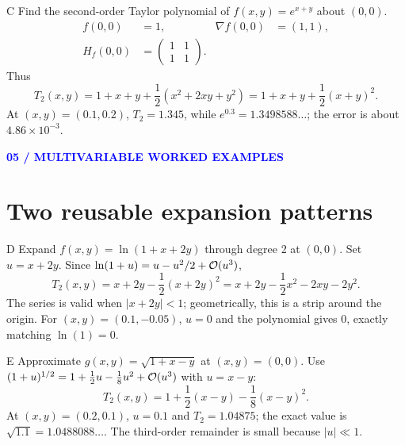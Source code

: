 \documentclass[11pt]{article}
\newcommand{\sectiontag}[1]{\textcolor{blue}{\sffamily\footnotesize\bfseries #1}\par\vspace{2pt}}
\begin{document}
\begin{worked}{C}
Find the second-order Taylor polynomial of $\displaystyle f(x,y)=e^{x+y}$ about $(0,0)$.
\begin{align*}
f(0,0)&=1, & \nabla f(0,0)&=(1,1),\\
H_f(0,0)&=\begin{pmatrix}1&1\\1&1\end{pmatrix}.
\end{align*}
Thus
\[
T_2(x,y)=1+x+y+\frac12(x^2+2xy+y^2)=1+x+y+\frac12(x+y)^2.
\]
At $(x,y)=(0.1,0.2)$, $T_2=1.345$, while $e^{0.3}=1.3498588\ldots$; the error is about $4.86\times10^{-3}$.
\end{worked}

\sectiontag{05 / MULTIVARIABLE WORKED EXAMPLES}\section*{Two reusable expansion patterns}
\begin{worked}{D}
Expand $\displaystyle f(x,y)=\ln(1+x+2y)$ through degree 2 at $(0,0)$.
Set $u=x+2y$. Since $\ln(1+u)=u-u^2/2+\mathcal O(u^3)$,
\[
T_2(x,y)=x+2y-\frac12(x+2y)^2
=x+2y-\frac12x^2-2xy-2y^2.
\]
The series is valid when $|x+2y|<1$; geometrically, this is a strip around the origin. For $(x,y)=(0.1,-0.05)$, $u=0$ and the polynomial gives $0$, exactly matching $\ln(1)=0$.
\end{worked}
\begin{worked}{E}
Approximate $\displaystyle g(x,y)=\sqrt{1+x-y}$ at $(x,y)=(0,0)$.
Use $(1+u)^{1/2}=1+\frac12u-\frac18u^2+\mathcal O(u^3)$ with $u=x-y$:
\[
T_2(x,y)=1+\frac12(x-y)-\frac18(x-y)^2.
\]
At $(x,y)=(0.2,0.1)$, $u=0.1$ and $T_2=1.04875$; the exact value is $\sqrt{1.1}=1.0488088\ldots$. The third-order remainder is small because $|u|\ll1$.
\end{worked}
\begin{center}
\end{center}
\end{document}
